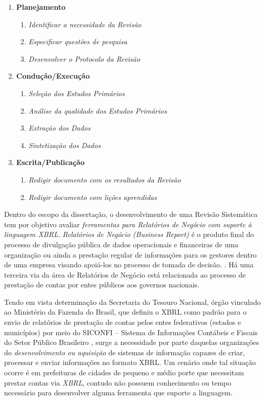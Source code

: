 \documentclass[msc,proposal,hidelot,hideabstract]{ppgccufmg} %
\begin{document}
\begin{enumerate}
  \item \textbf{Planejamento}
  \begin{enumerate}
    \item \textit{Identificar a necessidade da Revisão}
    \item \textit{Especificar questões de pesquisa}
    \item \textit{Desenvolver o Protocolo da Revisão}
  \end{enumerate}
  \item \textbf{Condução/Execução}
  \begin{enumerate}
    \item \textit{Seleção dos Estudos Primários}
    \item \textit{Análise da qualidade dos Estudos Primários}
     \item \textit{Extração dos Dados}
     \item \textit{Sintetização dos Dados}
   \end{enumerate}
  \item \textbf{Escrita/Publicação}
  \begin{enumerate}
    \item \textit{Redigir documento com os resultados da Revisão}
    \item \textit{Redigir documento com lições aprendidas}
  \end{enumerate}
\end{enumerate}


Dentro do escopo da dissertação, o desenvolvimento de uma Revisão Sistemática
tem por objetivo avaliar \textit{ferramentas para Relatórios de Negócio com suporte à linguagem XBRL}. \textit{Relatórios  de Negócio (Business Report)} é o produto final do  processo de divulgação pública de dados operacionais e financeiras de uma organização ou ainda a prestação regular de informações para os gestores dentro de uma empresa visando apoiá-los no processo de tomada de decisão.
\cite{lymer1999business}. Há uma terceira via da área de Relatórios de Negócio está relacionada ao processo de prestação de contas por entes públicos aos governos nacionais.

Tendo em vista determinação da Secretaria do Tesouro Nacional, órgão
vinculado ao  Ministério da Fazenda do Brasil, que definiu o XBRL como
padrão para o envio de relatórios de prestação de contas pelos entes
federativos (estados e municípios) por meio do SICONFI – Sistema de Informações Contábeis e Fiscais do Setor Público Brasileiro \cite{nt_03_2013}, surge a necessidade por parte
daquelas organizações do \textit{desenvolvimento ou aquisição} de sistemas de
informação capazes de criar, processar e enviar informações no formato
XBRL. Um cenário onde tal situação ocorre é em prefeituras de cidades de pequeno e médio porte que necessitam prestar contas via \textit{XBRL}, contudo
não possuem conhecimento ou tempo necessário para desenvolver alguma ferramenta que suporte a linguagem.
\end{document}
